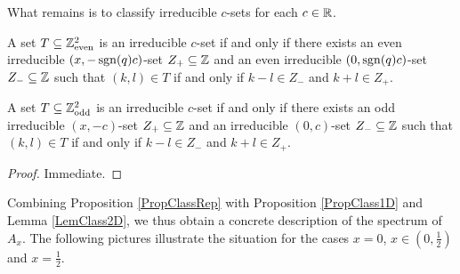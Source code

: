 What remains is to classify irreducible $c$-sets for each $c\in \mathbb{R}$.

\begin{Lem}\label{LemClass2D} A set $T\subseteq \mathbb{Z}^2_{\mathrm{even}}$ is an  irreducible $c$-set if and only if there exists an even irreducible $(x,-\operatorname{\mathrm{sgn}}(q)c)$-set $Z_+\subseteq \mathbb{Z}$ and an even irreducible $(0,\operatorname{\mathrm{sgn}}(q)c)$-set $Z_-\subseteq \mathbb{Z}$ such that $(k,l)\in T$ if and only if $k-l\in Z_-$ and $k+l\in Z_+$.

A set $T\subseteq \mathbb{Z}^2_{\mathrm{odd}}$ is an irreducible $c$-set if and only if there exists an odd irreducible $(x,-c)$-set $Z_+\subseteq \mathbb{Z}$ and an irreducible $(0,c)$-set $Z_-\subseteq \mathbb{Z}$ such that $(k,l)\in T$ if and only if $k-l\in Z_-$ and $k+l\in Z_+$.
\end{Lem} 

\begin{proof}
Immediate.
\end{proof}

Combining Proposition \ref{PropClassRep} with Proposition \ref{PropClass1D} and Lemma \ref{LemClass2D}, we thus obtain a concrete description of the spectrum of $A_x$. The following pictures illustrate the situation for the cases $x=0$, $x\in (0,\frac{1}{2})$ and $x=\frac{1}{2}$.













